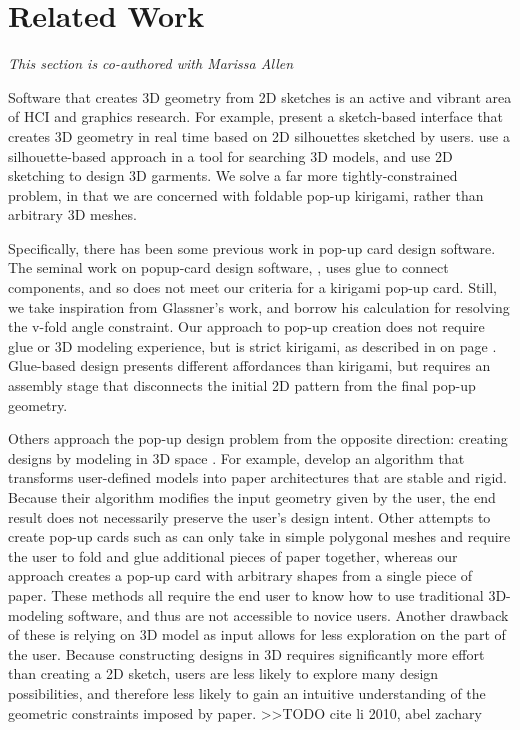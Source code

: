\section{Related Work}\label{related-work}

\emph{This section is co-authored with Marissa Allen}

Software that creates 3D geometry from 2D sketches is an active and
vibrant area of HCI and graphics research. For example,
\citet{igarashi2007teddy} present a sketch-based interface that creates
3D geometry in real time based on 2D silhouettes sketched by users.
\citet{patrick20022d} use a silhouette-based approach in a tool for
searching 3D models, and \citet{wang2003feature} use 2D sketching to
design 3D garments. We solve a far more tightly-constrained problem, in
that we are concerned with foldable pop-up kirigami, rather than
arbitrary 3D meshes.

Specifically, there has been some previous work in pop-up card design
software. The seminal work on popup-card design software,
\citet{glassner1998interactive}, uses glue to connect components, and so
does not meet our criteria for a kirigami pop-up card. Still, we take
inspiration from Glassner's work, and borrow his calculation for
resolving the v-fold angle constraint. Our approach to pop-up creation
does not require glue or 3D modeling experience, but is strict kirigami,
as described in  on page \pageref{background}.
Glue-based design presents different affordances than kirigami, but
requires an assembly stage that disconnects the initial 2D pattern from
the final pop-up geometry.

Others approach the pop-up design problem from the opposite direction:
creating designs by modeling in 3D space \citet{ruiz2014multi}. For
example, \citet{li2010popup} develop an algorithm that transforms
user-defined models into paper architectures that are stable and rigid.
Because their algorithm modifies the input geometry given by the user,
the end result does not necessarily preserve the user's design intent.
Other attempts to create pop-up cards such as \citet{abel2013algorithms}
can only take in simple polygonal meshes and require the user to fold
and glue additional pieces of paper together, whereas our approach
creates a pop-up card with arbitrary shapes from a single piece of
paper. These methods all require the end user to know how to use
traditional 3D-modeling software, and thus are not accessible to novice
users. Another drawback of these is relying on 3D model as input allows
for less exploration on the part of the user. Because constructing
designs in 3D requires significantly more effort than creating a 2D
sketch, users are less likely to explore many design possibilities, and
therefore less likely to gain an intuitive understanding of the
geometric constraints imposed by paper. \textgreater{}\textgreater{}TODO
cite li 2010, abel zachary

